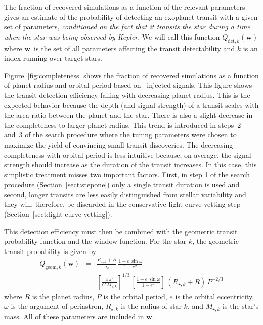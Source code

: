 \documentclass[manuscript, letterpaper]{aastex6}
\newcommand{\dfmfigref}[1]{\ref{fig:#1}}
\newcommand{\dfmFig}[1]{Figure~\dfmfigref{#1}}
\newcommand{\dfmfig}[1]{\dfmFig{#1}}
\newcommand{\eqlabel}[1]{\label{eq:#1}}
\newcommand{\sectionname}{Section}
\newcommand{\sectref}[1]{\ref{sect:#1}}
\newcommand{\Sect}[1]{\sectionname~\sectref{#1}}
\newcommand{\sect}[1]{\Sect{#1}}
\newcommand{\bvec}[1]{{\ensuremath{\boldsymbol{#1}}}}
\newcommand{\params}{{\ensuremath{\bvec{w}}}}
\begin{document}
The fraction of recovered simulations as a function of the relevant parameters
gives an estimate of the probability of detecting an exoplanet transit with a
given set of parameters, \emph{conditioned on the fact that it transits the
star during a time when the star was being observed by Kepler}.
We will call this function $Q_{\mathrm{det},k}(\params)$ where \params\ is the
set of all parameters affecting the transit detectability and $k$ is an index
running over target stars.

\dfmfig{completeness} shows the fraction of recovered simulations as a
function of planet radius and orbital period based on \numinjs\ injected
signals.
This figure shows the transit detection efficiency falling with decreasing
planet radius.
This is the expected behavior because the depth (and signal strength) of a
transit scales with the area ratio between the planet and the star.
There is also a slight decrease in the completeness to larger planet radius.
This trend is introduced in steps~2 and~3 of the search procedure where the
tuning parameters were chosen to maximize the yield of convincing small
transit discoveries.
The decreasing completeness with orbital period is less intuitive because, on
average, the signal strength should increase as the duration of the transit
increases.
In this case, this simplistic treatment misses two important factors.
First, in step 1 of the search procedure (\sect{stepone}) only a single
transit duration is used and second, longer transits are less easily
distinguished from stellar variability and they will, therefore, be discarded
in the conservative light curve vetting step (\sect{light-curve-vetting}).

This detection efficiency must then be combined with the geometric transit
probability function and the window function.
For the star $k$, the geometric transit probability is given by
\citep{Winn:2010}
\begin{eqnarray}\eqlabel{geom-comp}
Q_{\mathrm{geom},k} (\params) &=& \frac{R_{\star,k} + R}{a_k}
    \, \frac{1 + e\,\sin\omega}{1-e^2} \\
&=& \left[\frac{4\,\pi^2}{G\,M_{\star,k}}\right]^{1/3}
    \, \left[\frac{1 + e\,\sin \omega}{1-e^2}\right]\,(R_{\star,k}+R)
    \, P^{-2/3}
\end{eqnarray}
where $R$ is the planet radius, $P$ is the orbital period, $e$ is the orbital
eccentricity, $\omega$ is the argument of periastron, $R_{\star,k}$ is
the radius of star $k$, and $M_{\star,k}$ is the star's mass.
All of these parameters are included in \params.
\end{document}
